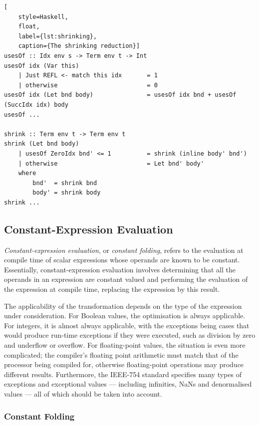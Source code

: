 \begin{lstlisting}[
    style=Haskell,
    float,
    label={lst:shrinking},
    caption={The shrinking reduction}]
usesOf :: Idx env s -> Term env t -> Int
usesOf idx (Var this)
    | Just REFL <- match this idx       = 1
    | otherwise                         = 0
usesOf idx (Let bnd body)               = usesOf idx bnd + usesOf (SuccIdx idx) body
usesOf ...

shrink :: Term env t -> Term env t
shrink (Let bnd body)
    | usesOf ZeroIdx bnd' <= 1          = shrink (inline body' bnd')
    | otherwise                         = Let bnd' body'
    where
        bnd'  = shrink bnd
        body' = shrink body
shrink ...
\end{lstlisting}


\subsection{Constant-Expression Evaluation}

\emph{Constant-expression evaluation}, or \emph{constant folding}, refers to the
evaluation at compile time of scalar expressions whose operands are known to be
constant. Essentially, constant-expression evaluation involves determining that
all the operands in an expression are constant valued and performing the
evaluation of the expression at compile time, replacing the expression by this
result.

The applicability of the transformation depends on the type of the expression
under consideration. For Boolean values, the optimisation is always applicable.
For integers, it is almost always applicable, with the exceptions being cases
that would produce run-time exceptions if they were executed, such as division
by zero and underflow or overflow. For floating-point values, the situation is
even more complicated; the compiler's floating point arithmetic must match that
of the processor being compiled for, otherwise floating-point operations may
produce different results. Furthermore, the IEEE-754 standard specifies many
types of exceptions and exceptional values --- including infinities, NaNs and
denormalised values --- all of which should be taken into account.


\subsubsection{Constant Folding}

